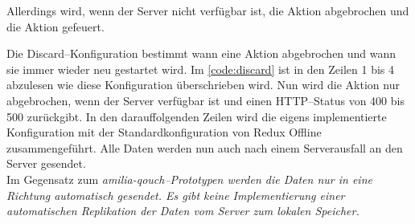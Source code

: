 Allerdings wird, wenn der Server nicht verfügbar ist, die Aktion abgebrochen und die  Aktion gefeuert.
\begin{center}
  
\end{center}
%
Die Discard--Konfiguration bestimmt wann eine Aktion abgebrochen und wann sie immer wieder neu gestartet wird.
Im \autoref{code:discard} ist in den Zeilen 1 bis 4 abzulesen wie diese Konfiguration überschrieben wird.
Nun wird die Aktion nur abgebrochen, wenn der Server verfügbar ist und einen \gls{HTTP}--Status von 400 bis 500 zurückgibt.
In den darauffolgenden Zeilen wird die eigens implementierte Konfiguration mit der Standardkonfiguration von Redux Offline zusammengeführt.
Alle Daten werden nun auch nach einem Serverausfall an den Server gesendet.\\
Im Gegensatz zum \it{amilia-qouch}--Prototypen werden die Daten nur in eine Richtung automatisch gesendet.
Es gibt keine Implementierung einer automatischen Replikation der Daten vom Server zum lokalen Speicher.